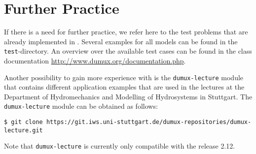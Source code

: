 \section{Further Practice}
\label{tutorial-furtherpractice}

If there is a need for further practice, we refer here to the test problems that
are already implemented in \Dumux. Several examples for all models
can be found in the \texttt{test}-directory. An overview over the available test
cases can be found in the class documentation \url{http://www.dumux.org/documentation.php}.

Another possibility to gain more experience with \Dumux is the \texttt{dumux-lecture} module
that contains different application examples that are used in the lectures at the
Department of Hydromechanics and Modelling of Hydrosystems in Stuttgart.
The \texttt{dumux-lecture} module can be obtained as follows:
\begin{lstlisting}[style=Bash]
$ git clone https://git.iws.uni-stuttgart.de/dumux-repositories/dumux-lecture.git
\end{lstlisting}
Note that \texttt{dumux-lecture} is currently only compatible with the \Dumux release 2.12.

